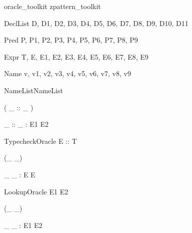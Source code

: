 \documentclass{article}
\begin{document}
\begin{zsection}
  \SECTION oracle\_toolkit \parents zpattern\_toolkit
\end{zsection}

\begin{zedjoker}{DeclList} D, D1, D2, D3, D4, D5, D6, D7, D8, D9, D10, D11 \end{zedjoker}
\begin{zedjoker}{Pred} P, P1, P2, P3, P4, P5, P6, P7, P8, P9 \end{zedjoker}
\begin{zedjoker}{Expr} T, E, E1, E2, E3, E4, E5, E6, E7, E8, E9 \end{zedjoker}
\begin{zedjoker}{Name} v, v1, v2, v3, v4, v5, v6, v7, v8, v9 \end{zedjoker}
\begin{zedjoker}{NameList}NameList\end{zedjoker}

\begin{zed}
  \relation ( \_ :: \_ )
\end{zed}

\begin{gendef}[E1,E2]
  \_ :: \_ : E1 \rel E2
\end{gendef}

\begin{zedoracle}{TypecheckOracle}
  E :: T
\end{zedoracle}




\begin{zed}
  \relation (\_ \hasDefn \_)
\end{zed}

\begin{gendef}[E]
  \_ \hasDefn \_ : E \rel E
\end{gendef}

\begin{zedoracle}{LookupOracle}
  E1 \hasDefn E2
\end{zedoracle}




\begin{zed}
  \relation (\_ \is \_)
\end{zed}

\begin{gendef}[E1,E2]
  \_ \is \_ : E1 \rel E2
\end{gendef}
\end{document}

